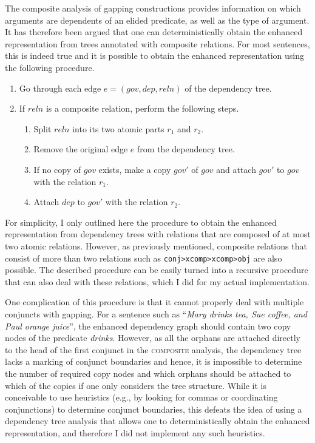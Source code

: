 \documentclass[lucida,biblatex]{sp} %
\begin{document}
The {\sc composite} analysis of gapping constructions provides information on which arguments are dependents of an elided predicate, as well as the type of argument. It has therefore been argued that one can deterministically obtain the enhanced representation from trees annotated with composite relations. For most sentences, this is indeed true and it is possible to obtain the enhanced representation using the following procedure. 

\begin{enumerate}
\item Go through each edge $e=(gov, dep, reln)$ of the dependency tree.
\item If $reln$ is a composite relation, perform the following steps.
\begin{enumerate}
\item Split $reln$ into its two atomic parts $r_1$ and $r_2$.
\item Remove the original edge $e$ from the dependency tree.
\item If no copy of $gov$ exists, make a copy $gov'$ of $gov$ and attach $gov'$ to $gov$ with the relation $r_1$.
\item Attach $dep$ to $gov'$ with the relation $r_2$. 
\end{enumerate}
\end{enumerate}

For simplicity, I only outlined here the procedure to obtain the enhanced representation from dependency trees with relations that are composed of at most two atomic relations. However, as previously mentioned, composite relations that consist of more than two relations such as \texttt{conj>xcomp>xcomp>obj} are also possible. The described procedure can be easily turned into a recursive procedure that can also deal with these relations, which I did for my actual implementation.

One complication of this procedure is that it cannot properly deal with multiple conjuncts with gapping. For a sentence such as ``\textit{Mary drinks tea, Sue coffee, and Paul orange juice}'', the enhanced dependency graph should contain two copy nodes of the predicate \textit{drinks}. However, as all the orphans are attached directly to the head of the first conjunct in the \textsc{composite} analysis, the dependency tree lacks a marking of conjunct boundaries and hence, it is impossible to determine the number of required copy nodes and which orphans should be attached to which of the copies if one only considers the tree structure. While it is conceivable to use heuristics (e.g., by looking for commas or coordinating conjunctions) to determine conjunct boundaries, this defeats the idea of using a dependency tree analysis that allows one to deterministically obtain the enhanced representation, and therefore I did not implement any such heuristics. 
\end{document}
